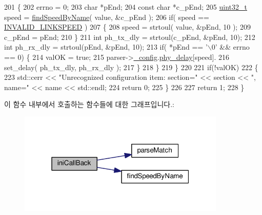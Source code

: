 \begin{DoxyCode}
201         \{
202             errno = 0;
203             \textcolor{keywordtype}{char} *pEnd;
204             \textcolor{keyword}{const} \textcolor{keywordtype}{char} *c\_pEnd;
205         \hyperlink{parse_8c_a6eb1e68cc391dd753bc8ce896dbb8315}{uint32\_t} speed = \hyperlink{gptp__cfg_8cpp_aa405c37824ec023aa9e9b17f467de579}{findSpeedByName}( value, &c\_pEnd );
206         \textcolor{keywordflow}{if}( speed == \hyperlink{gptp__cfg_8hpp_a8b3f08c4bbdb0c6071d0c950ff4d99e5}{INVALID\_LINKSPEED} )
207         \{
208             speed = strtoul( value, &pEnd, 10 );
209             c\_pEnd = pEnd;
210         \}
211             \textcolor{keywordtype}{int} ph\_tx\_dly = strtoul(c\_pEnd, &pEnd, 10);
212             \textcolor{keywordtype}{int} ph\_rx\_dly = strtoul(pEnd, &pEnd, 10);
213             \textcolor{keywordflow}{if}( *pEnd == \textcolor{charliteral}{'\(\backslash\)0'} && errno == 0) \{
214                 valOK = \textcolor{keyword}{true};
215                 parser->\hyperlink{class_gptp_ini_parser_a8733e97ddaee116e34a67d3e222e45c9}{\_config}.\hyperlink{struct_gptp_ini_parser_1_1gptp__cfg__t_afdea28a656b2ebb14b4bb2354f9d7601}{phy\_delay}[speed].
216             set\_delay( ph\_tx\_dly, ph\_rx\_dly );
217             \}
218         \}
219     \}
220 
221     \textcolor{keywordflow}{if}(!valOK)
222     \{
223         std::cerr << \textcolor{stringliteral}{"Unrecognized configuration item: section="} << section << \textcolor{stringliteral}{", name="} << name << 
      std::endl;
224         \textcolor{keywordflow}{return} 0;
225     \}
226 
227     \textcolor{keywordflow}{return} 1;
228 \}
\end{DoxyCode}


이 함수 내부에서 호출하는 함수들에 대한 그래프입니다.\+:
\nopagebreak
\begin{figure}[H]
\begin{center}
\leavevmode
\includegraphics[width=280pt]{class_gptp_ini_parser_a13494bbd725f144dc32c2565fdfdbad5_cgraph}
\end{center}
\end{figure}




